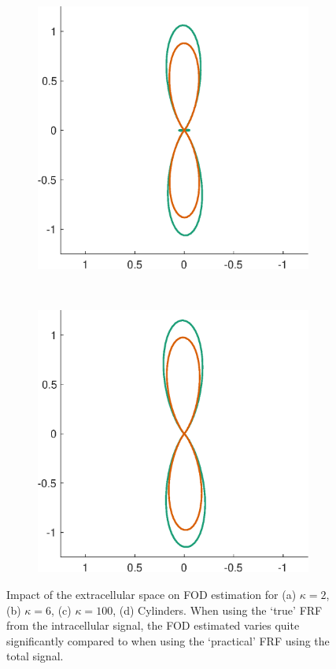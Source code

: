 \begin{figure}
  \begin{subfigure}[]{0.4\textwidth}
    \includegraphics[width=\textwidth]{figures/frf_experiment/fod_inex_b3000_kappa100}
    \caption{}
  \end{subfigure}
  ~
  \begin{subfigure}[]{0.4\textwidth}
    \includegraphics[width=\textwidth]{figures/frf_experiment/fod_inex_b3000_GamCyl}
    \caption{}
  \end{subfigure}

  \caption[Impact of the extracellular space on FOD estimate]{Impact of the extracellular space on FOD estimation for (a) $\kappa=2$, (b) $\kappa=6$, (c) $\kappa=100$, (d) Cylinders. When using the `true' \ac{FRF} from the intracellular signal, the \ac{FOD} estimated varies quite significantly compared to when using the `practical' \ac{FRF} using the total signal.}
  \label{fig:frf_intra_ex_fod}
\end{figure}


